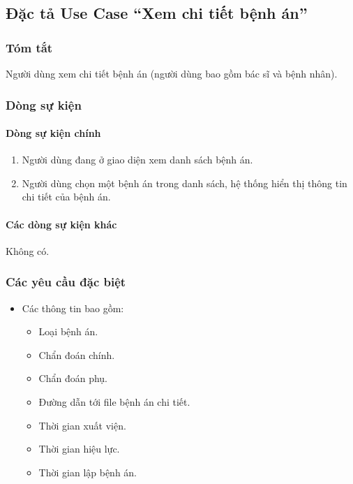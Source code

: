 \subsection{Đặc tả Use Case ``Xem chi tiết bệnh án''}

\subsubsection{Tóm tắt}
Người dùng xem chi tiết bệnh án (người dùng bao gồm bác sĩ và bệnh nhân).

\subsubsection{Dòng sự kiện}
\paragraph{\textbf{Dòng sự kiện chính}}
\begin{enumerate}
    \item Người dùng đang ở giao diện xem danh sách bệnh án.
    \item Người dùng chọn một bệnh án trong danh sách, hệ thống hiển thị thông tin chi tiết của bệnh án.
\end{enumerate}

\paragraph{\textbf{Các dòng sự kiện khác}}
Không có.

\subsubsection{Các yêu cầu đặc biệt}
\begin{itemize}
    \item Các thông tin bao gồm:
    \begin{itemize}
        \item Loại bệnh án.
        \item Chẩn đoán chính.
        \item Chẩn đoán phụ.
        \item Đường dẫn tới file bệnh án chi tiết.
        \item Thời gian xuất viện.
        \item Thời gian hiệu lực.
        \item Thời gian lập bệnh án.
    \end{itemize}
\end{itemize}

